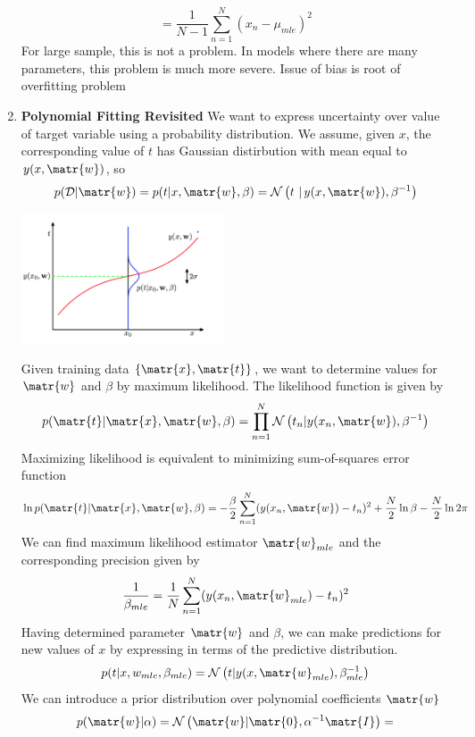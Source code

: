\documentclass[11pt]{article}
\begin{document}
\begin{defn*}
\begin{enumerate}
\[            = \frac{1}{N-1}
            \sum_{n=1}^N (x_n - \mu_{mle})^2
        \]
        For large sample, this is not a problem. In models where there are many parameters, this problem is much more severe. Issue of bias is root of overfitting problem 
        \item \textbf{Polynomial Fitting Revisited} We want to express uncertainty over value of target variable using a probability distribution. We assume, given $x$, the corresponding value of $t$ has Gaussian distirbution with mean equal to $y(x,\matr{w})$, so 
        \[
            p(\mathcal{D}|\matr{w}) = 
            p(t|x,\matr{w},\beta) = 
            \normal{t \,\, |\, y(x,\matr{w}), \beta^{-1}}
        \]
        \begin{center}
            \includegraphics[width=6cm]{gaussian_conditional_poly_fitting.jpg}
        \end{center}
        Given training data $\{\matr{x}, \matr{t}\}$, we want to determine values for $\matr{w}$ and $\beta$ by maximum likelihood. The likelihood function is given by 
        \[
            p(\matr{t}|\matr{x}, \matr{w}, \beta) = 
            \prod_{n=1}^N \normal{t_n | y(x_n, \matr{w}), \beta^{-1}}    
        \]
        Maximizing likelihood is equivalent to minimizing sum-of-squares error function
        \[
            \ln{p(\matr{t}|\matr{x}, \matr{w}, \beta)}  
            = -\frac{\beta}{2} \sum_{n=1}^N (y(x_n, \matr{w}) - t_n)^2 + \frac{N}{2}\ln{\beta} -  \frac{N}{2} \ln{2\pi}  
        \]
        We can find maximum likelihood estimator $\matr{w}_{mle}$ and the corresponding precision given by 
        \[
            \frac{1}{\beta_{mle}} = \frac{1}{N}\sum_{n=1}^N (y(x_n, \matr{w}_{mle} ) - t_n)^2
        \]
        Having determined parameter $\matr{w}$ and $\beta$, we can make predictions for new values of $x$ by expressing in terms of the predictive distribution. 
        \[
            p(t|x,w_{mle}, \beta_{mle})
            = 
            \normal{t|y(x,\matr{w}_{mle}), \beta^{-1}_{mle}}
        \]
        We can introduce a prior distribution over polynomial coefficients $\matr{w}$
        \[
            p(\matr{w}|\alpha) = 
            \normal{\matr{w}| \matr{0}, \alpha^{-1}\matr{I}} = 
\]
\end{enumerate}
\end{defn*}
\end{document}
